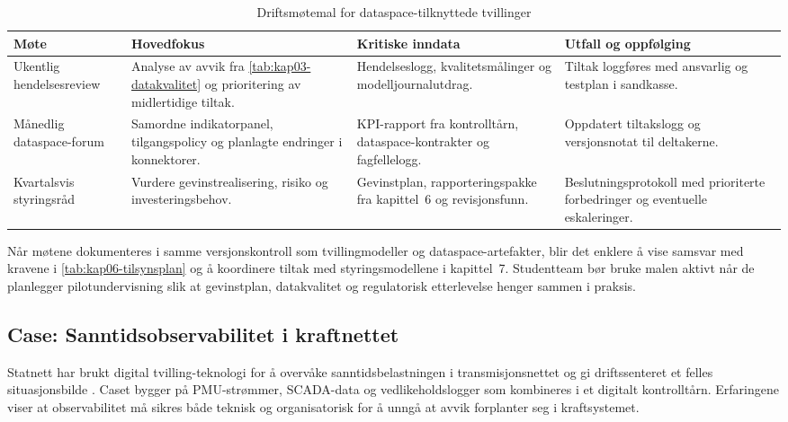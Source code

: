 \begin{table}[ht]
    \centering
    \caption{Driftsmøtemal for dataspace-tilknyttede tvillinger}
    \label{tab:dataspace-drift}
    \begin{tabular}{p{3.2cm}p{4.6cm}p{4.0cm}p{3.4cm}}
        \toprule
        Møte & Hovedfokus & Kritiske inndata & Utfall og oppfølging \\
        \midrule
        Ukentlig hendelsesreview & Analyse av avvik fra \autoref{tab:kap03-datakvalitet} og prioritering av midlertidige tiltak. & Hendelseslogg, kvalitetsmålinger og modelljournalutdrag. & Tiltak loggføres med ansvarlig og testplan i sandkasse. \\
        Månedlig dataspace-forum & Samordne indikatorpanel, tilgangspolicy og planlagte endringer i konnektorer. & KPI-rapport fra kontrolltårn, dataspace-kontrakter og fagfellelogg. & Oppdatert tiltakslogg og versjonsnotat til deltakerne. \\
        Kvartalsvis styringsråd & Vurdere gevinstrealisering, risiko og investeringsbehov. & Gevinstplan, rapporteringspakke fra kapittel~6 og revisjonsfunn. & Beslutningsprotokoll med prioriterte forbedringer og eventuelle eskaleringer. \\
        \bottomrule
    \end{tabular}
\end{table}

Når møtene dokumenteres i samme versjonskontroll som tvillingmodeller og dataspace-artefakter, blir det enklere å vise samsvar med kravene i \autoref{tab:kap06-tilsynsplan} og å koordinere tiltak med styringsmodellene i kapittel~7. Studentteam bør bruke malen aktivt når de planlegger pilotundervisning slik at gevinstplan, datakvalitet og regulatorisk etterlevelse henger sammen i praksis.


\subsection{Case: Sanntidsobservabilitet i kraftnettet}
Statnett har brukt digital tvilling-teknologi for å overvåke sanntidsbelastningen i transmisjonsnettet og gi driftssenteret et felles situasjonsbilde \citep{statnett2023digital,statnett2024kontrolltarn}. Caset bygger på PMU-strømmer, SCADA-data og vedlikeholdslogger som kombineres i et digitalt kontrolltårn. Erfaringene viser at observabilitet må sikres både teknisk og organisatorisk for å unngå at avvik forplanter seg i kraftsystemet.

